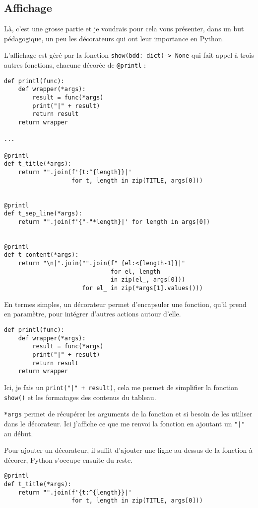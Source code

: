 \subsection*{Affichage}
Là, c'est une grosse partie et je voudrais pour cela vous présenter, dans un but pédagogique, un peu les décorateurs qui ont leur importance en Python.
\medskip

L'affichage est géré par la fonction \texttt{show(bdd: dict)-> None} qui fait appel à trois autres fonctions, chacune décorée de \texttt{@printl} :
\begin{lstlisting}
def printl(func):
    def wrapper(*args):
        result = func(*args)
        print("|" + result)
        return result
    return wrapper

...

@printl
def t_title(*args):
    return "".join(f'{t:^{length}}|'
                   for t, length in zip(TITLE, args[0]))


@printl
def t_sep_line(*args):
    return "".join(f'{"-"*length}|' for length in args[0])


@printl
def t_content(*args):
    return "\n|".join("".join(f" {el:<{length-1}}|"
                              for el, length
                              in zip(el_, args[0]))
                      for el_ in zip(*args[1].values()))
\end{lstlisting}
\medskip

En termes simples, un décorateur permet d'encapsuler une fonction, qu'il prend en paramètre, pour intégrer d'autres actions autour d'elle.
\begin{lstlisting}
def printl(func):
    def wrapper(*args):
        result = func(*args)
        print("|" + result)
        return result
    return wrapper
\end{lstlisting}
\medskip

Ici, je fais un \texttt{print("|" + result)}, cela me permet de simplifier la fonction \texttt{show()} et les formatages des contenus du tableau.
\medskip

\texttt{*args} permet de récupérer les arguments de la fonction et si besoin de les utiliser dans le décorateur. Ici j'affiche ce que me renvoi la fonction en ajoutant un \texttt{"|"} au début.
\medskip

Pour ajouter un décorateur, il suffit d'ajouter une ligne au-dessus de la fonction à décorer, Python s'occupe ensuite du reste.
\begin{lstlisting}
@printl
def t_title(*args):
    return "".join(f'{t:^{length}}|'
                   for t, length in zip(TITLE, args[0]))
\end{lstlisting}
\medskip

